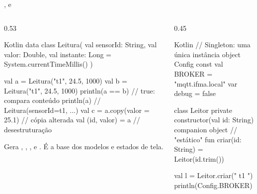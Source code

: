 \documentclass[aspectratio=169,10pt]{beamer}
\begin{document}
\begin{frame}[fragile]{,  e }
  \begin{columns}[T]
    \begin{column}{0.53\textwidth}
\begin{codigo}[title=Data class]{Kotlin}
data class Leitura(
  val sensorId: String,
  val valor: Double,
  val instante: Long = System.currentTimeMillis()
)

val a = Leitura("t1", 24.5, 1000)
val b = Leitura("t1", 24.5, 1000)
println(a == b)            // true: compara conteúdo
println(a)                 // Leitura(sensorId=t1, ...)
val c = a.copy(valor = 25.1)  // cópia alterada
val (id, valor) = a        // desestruturação
\end{codigo}
      \begin{conceito}
        Gera , , ,  e . É a base dos modelos e estados de tela.
      \end{conceito}
    \end{column}
    \begin{column}{0.45\textwidth}
\begin{codigo}[title=object e companion]{Kotlin}
// Singleton: uma única instância
object Config {
  const val BROKER = "mqtt.ifma.local"
  var debug = false
}

class Leitor private constructor(val id: String) {
  companion object {   // "estático"
    fun criar(id: String) = Leitor(id.trim())
  }
}

val l = Leitor.criar(" t1 ")
println(Config.BROKER)
\end{codigo}
    \end{column}
  \end{columns}
\end{frame}
\end{document}

